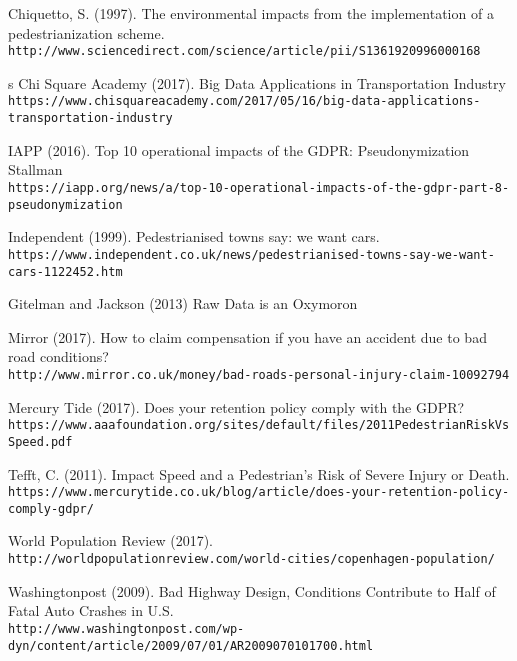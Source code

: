 \documentclass[format=acmsmall, review=false, screen=true]{acmart}
\begin{document}
\newpage
\begin{thebibliography}{9}
Chiquetto, S. (1997). The environmental impacts from the implementation of a pedestrianization scheme. \\\texttt{http://www.sciencedirect.com/science/article/pii/S1361920996000168}
 
 s
Chi Square Academy (2017). Big Data Applications in Transportation Industry\\\texttt{https://www.chisquareacademy.com/2017/05/16/big-data-applications-transportation-industry}
 
IAPP (2016). Top 10 operational impacts of the GDPR: Pseudonymization Stallman\\\texttt{https://iapp.org/news/a/top-10-operational-impacts-of-the-gdpr-part-8-pseudonymization}

Independent (1999). Pedestrianised towns say: we want cars.
\\\texttt{https://www.independent.co.uk/news/pedestrianised-towns-say-we-want-cars-1122452.htm}

Gitelman and Jackson (2013) Raw Data is an Oxymoron

Mirror (2017). How to claim compensation if you have an accident due to bad road conditions?
\\\texttt{http://www.mirror.co.uk/money/bad-roads-personal-injury-claim-10092794}

Mercury Tide (2017). Does your retention policy comply with the GDPR?
\\\texttt{https://www.aaafoundation.org/sites/default/files/2011PedestrianRiskVsSpeed.pdf}

Tefft, C. (2011). Impact Speed and a Pedestrian’s Risk of Severe Injury or Death.
\\\texttt{https://www.mercurytide.co.uk/blog/article/does-your-retention-policy-comply-gdpr/}

World Population Review (2017).
\\\texttt{http://worldpopulationreview.com/world-cities/copenhagen-population/}

Washingtonpost (2009). Bad Highway Design, Conditions Contribute to Half of Fatal Auto Crashes in U.S. \\\texttt{http://www.washingtonpost.com/wp-dyn/content/article/2009/07/01/AR2009070101700.html}
\end{thebibliography}
\end{document}
